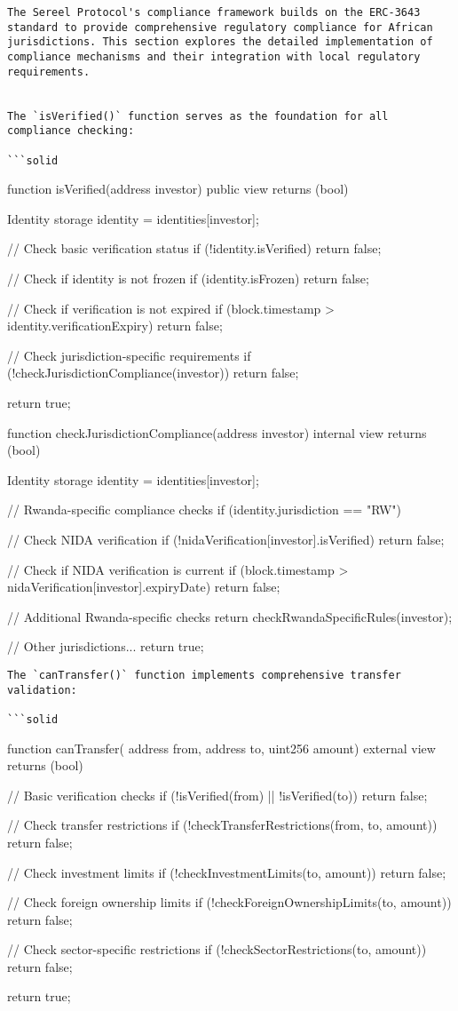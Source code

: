 \documentclass[12pt]{article}
\begin{document}
\begin{lstlisting}
The Sereel Protocol's compliance framework builds on the ERC-3643 standard to provide comprehensive regulatory compliance for African jurisdictions. This section explores the detailed implementation of compliance mechanisms and their integration with local regulatory requirements.


The `isVerified()` function serves as the foundation for all compliance checking:

```solid
\end{lstlisting}
function isVerified(address investor) public view returns (bool) {    Identity storage identity = identities[investor];

    // Check basic verification status    if (!identity.isVerified) {        return false;    }

    // Check if identity is not frozen    if (identity.isFrozen) {        return false;    }

    // Check if verification is not expired    if (block.timestamp > identity.verificationExpiry) {        return false;    }

    // Check jurisdiction-specific requirements    if (!checkJurisdictionCompliance(investor)) {        return false;    }

    return true;}

function checkJurisdictionCompliance(address investor) internal view returns (bool) {    Identity storage identity = identities[investor];

    // Rwanda-specific compliance checks    if (identity.jurisdiction == "RW") {        // Check NIDA verification        if (!nidaVerification[investor].isVerified) {            return false;        }

        // Check if NIDA verification is current        if (block.timestamp > nidaVerification[investor].expiryDate) {            return false;        }

        // Additional Rwanda-specific checks        return checkRwandaSpecificRules(investor);    }

    // Other jurisdictions...    return true;}
\begin{lstlisting}
The `canTransfer()` function implements comprehensive transfer validation:

```solid
\end{lstlisting}
function canTransfer(    address from,    address to,    uint256 amount) external view returns (bool) {    // Basic verification checks    if (!isVerified(from) || !isVerified(to)) {        return false;    }

    // Check transfer restrictions    if (!checkTransferRestrictions(from, to, amount)) {        return false;    }

    // Check investment limits    if (!checkInvestmentLimits(to, amount)) {        return false;    }

    // Check foreign ownership limits    if (!checkForeignOwnershipLimits(to, amount)) {        return false;    }

    // Check sector-specific restrictions    if (!checkSectorRestrictions(to, amount)) {        return false;    }

    return true;}
\end{document}
